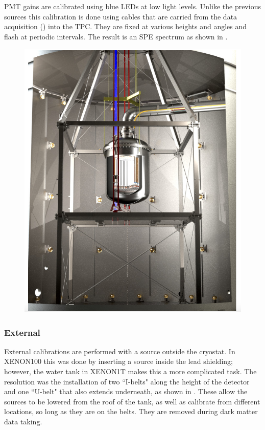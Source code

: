PMT gains are calibrated using blue LEDs at low light levels.  Unlike the previous sources this calibration is done using cables that are
carried from the data acquisition () into the TPC.  They are fixed at various heights and angles and flash
at periodic intervals.  The result is an SPE spectrum as shown in .

\begin{figure}
\centering
\includegraphics[width=\textwidth]{WaterTankInside}
\label{fig:water_tank_inside}
\end{figure}



\subsubsection{External}
\label{subsubsec:xenon1t_calibrations_external}
External calibrations are performed with a source outside the cryostat.  In XENON100 this was done by inserting a source inside the lead
shielding; however, the water tank in XENON1T makes this a more complicated task.  The resolution was the installation of two ``I-belts"
along the height of the detector and one ``U-belt" that also extends underneath, as shown in
.  These
allow the sources to be lowered from the roof of the tank, as well as calibrate from different locations, so long as they are on the
belts.  They are removed during dark matter data taking.

